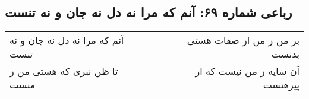 \begin{center}
\section*{رباعی شماره ۶۹: آنم که مرا نه دل نه جان و نه تنست}
\label{sec:sh069}
\begin{longtable}{l p{0.5cm} r}
آنم که مرا نه دل نه جان و نه تنست
&&
بر من ز من از صفات هستی بدنست
\\
تا ظن نبری که هستی من ز منست
&&
آن سایه ز من نیست که از پیرهنست
\\
\end{longtable}
\end{center}
